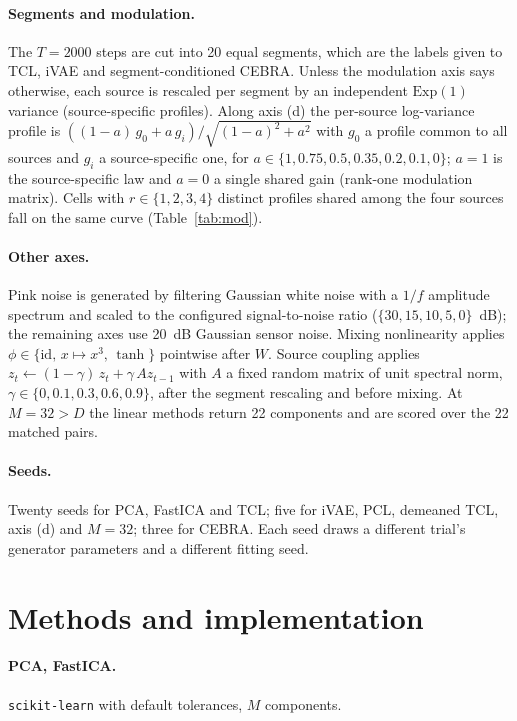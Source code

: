 \paragraph{Segments and modulation.}
The $T = 2000$ steps are cut into 20 equal segments, which are the labels given to TCL, iVAE and segment-conditioned CEBRA.
Unless the modulation axis says otherwise, each source is rescaled per segment by an independent $\mathrm{Exp}(1)$ variance (source-specific profiles).
Along axis (d) the per-source log-variance profile is $((1-a)\,g_0 + a\,g_i)/\sqrt{(1-a)^2 + a^2}$ with $g_0$ a profile common to all sources and $g_i$ a source-specific one, for $a \in \{1, 0.75, 0.5, 0.35, 0.2, 0.1, 0\}$; $a = 1$ is the source-specific law and $a = 0$ a single shared gain (rank-one modulation matrix).
Cells with $r \in \{1, 2, 3, 4\}$ distinct profiles shared among the four sources fall on the same curve (Table~\ref{tab:mod}).

\paragraph{Other axes.}
Pink noise is generated by filtering Gaussian white noise with a $1/f$ amplitude spectrum and scaled to the configured signal-to-noise ratio ($\{30, 15, 10, 5, 0\}$~dB); the remaining axes use 20~dB Gaussian sensor noise.
Mixing nonlinearity applies $\phi \in \{\mathrm{id},\, x \mapsto x^3,\, \tanh\}$ pointwise after $W$.
Source coupling applies $z_t \leftarrow (1-\gamma)\, z_t + \gamma\, A z_{t-1}$ with $A$ a fixed random matrix of unit spectral norm, $\gamma \in \{0, 0.1, 0.3, 0.6, 0.9\}$, after the segment rescaling and before mixing.
At $M = 32 > D$ the linear methods return 22 components and are scored over the 22 matched pairs.

\paragraph{Seeds.}
Twenty seeds for PCA, FastICA and TCL; five for iVAE, PCL, demeaned TCL, axis (d) and $M = 32$; three for CEBRA.
Each seed draws a different trial's generator parameters and a different fitting seed.

\section{Methods and implementation}
\label{app:methods}

\paragraph{PCA, FastICA.} \texttt{scikit-learn} with default tolerances, $M$ components.

